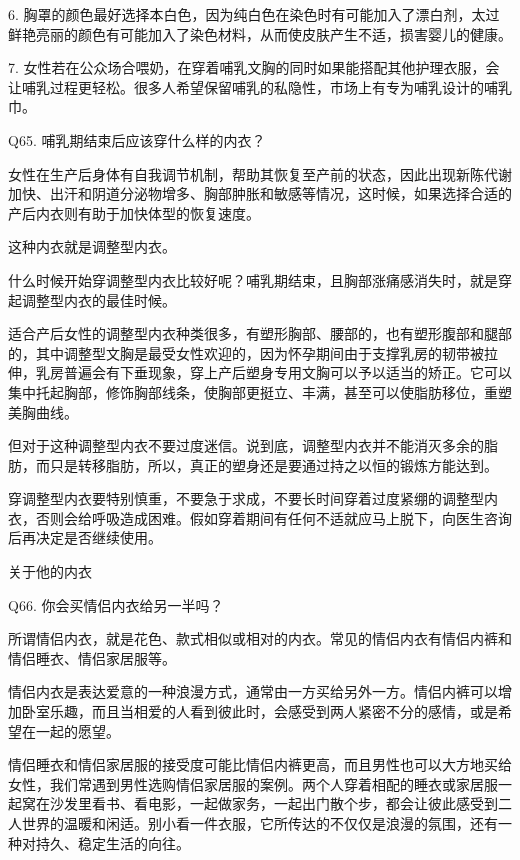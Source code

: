 \documentclass[12pt,UTF8]{ctexbook}
\begin{document}
6. 胸罩的颜色最好选择本白色，因为纯白色在染色时有可能加入了漂白剂，太过鲜艳亮丽的颜色有可能加入了染色材料，从而使皮肤产生不适，损害婴儿的健康。


7. 女性若在公众场合喂奶，在穿着哺乳文胸的同时如果能搭配其他护理衣服，会让哺乳过程更轻松。很多人希望保留哺乳的私隐性，市场上有专为哺乳设计的哺乳巾。





Q65. 哺乳期结束后应该穿什么样的内衣？


女性在生产后身体有自我调节机制，帮助其恢复至产前的状态，因此出现新陈代谢加快、出汗和阴道分泌物增多、胸部肿胀和敏感等情况，这时候，如果选择合适的产后内衣则有助于加快体型的恢复速度。

这种内衣就是调整型内衣。

什么时候开始穿调整型内衣比较好呢？哺乳期结束，且胸部涨痛感消失时，就是穿起调整型内衣的最佳时候。

适合产后女性的调整型内衣种类很多，有塑形胸部、腰部的，也有塑形腹部和腿部的，其中调整型文胸是最受女性欢迎的，因为怀孕期间由于支撑乳房的韧带被拉伸，乳房普遍会有下垂现象，穿上产后塑身专用文胸可以予以适当的矫正。它可以集中托起胸部，修饰胸部线条，使胸部更挺立、丰满，甚至可以使脂肪移位，重塑美胸曲线。

但对于这种调整型内衣不要过度迷信。说到底，调整型内衣并不能消灭多余的脂肪，而只是转移脂肪，所以，真正的塑身还是要通过持之以恒的锻炼方能达到。

穿调整型内衣要特别慎重，不要急于求成，不要长时间穿着过度紧绷的调整型内衣，否则会给呼吸造成困难。假如穿着期间有任何不适就应马上脱下，向医生咨询后再决定是否继续使用。





关于他的内衣


Q66. 你会买情侣内衣给另一半吗？


所谓情侣内衣，就是花色、款式相似或相对的内衣。常见的情侣内衣有情侣内裤和情侣睡衣、情侣家居服等。

情侣内衣是表达爱意的一种浪漫方式，通常由一方买给另外一方。情侣内裤可以增加卧室乐趣，而且当相爱的人看到彼此时，会感受到两人紧密不分的感情，或是希望在一起的愿望。

情侣睡衣和情侣家居服的接受度可能比情侣内裤更高，而且男性也可以大方地买给女性，我们常遇到男性选购情侣家居服的案例。两个人穿着相配的睡衣或家居服一起窝在沙发里看书、看电影，一起做家务，一起出门散个步，都会让彼此感受到二人世界的温暖和闲适。别小看一件衣服，它所传达的不仅仅是浪漫的氛围，还有一种对持久、稳定生活的向往。
\end{document}
